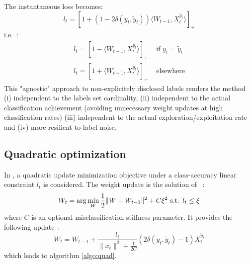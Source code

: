 \documentclass[preprint,12pt,authoryear]{elsarticle}
\begin{document}
The instantaneous loss becomes:
\begin{equation}\label{eq:loss}
l_t = [1 + (1 - 2 \delta(y_t,\tilde{y}_t)) \langle W_{t-1}, X_t^{\tilde{y}_t}\rangle]_+
\end{equation}
i.e.~:
\begin{align}
	l_t = [1 - \langle W_{t-1}, X_t^{\tilde{y}_t}\rangle]_+ &\text{ if }y_t=\tilde{y}_t\label{eq:loss-A}\\
	l_t = [1 + \langle W_{t-1}, X_t^{\tilde{y}_t}\rangle]_+ &\text{ elsewhere} \label{eq:loss-B}
\end{align}
This "agnostic" approach to non-explicitely disclosed labels %
renders the method (i) independent to the labels set cardinality, (ii) independent to the actual classification achievement (avoiding unnecessary weight updates at high classification rates) (iii) independent to the actual exploration/exploitation rate and (iv) more resilient to label noise. 

\subsection{Quadratic optimization}
 
In \cite{crammer2006online}, a quadratic update minimization objective under a class-accuracy linear constraint $ l_t $ is considered.  
The weight update is the solution of ~:
$$W_{t} = \arg \min_W \frac{1}{2} \| W - W_{t-1}\|^2 + C \xi^2 \hbox{ s.t. } l_t \leq \xi$$
where $C$ is an optional misclassification stiffness parameter. It provides the following update~:
$$W_{t} =  W_{t-1} + \frac{l_t}{\|x_t\|^2 + \frac{1}{2C}} (2\delta(y_t,\tilde{y}_t) - 1) X_t^{\tilde{y}_t}$$
which leads to algorithm \ref{algo:quad}.
\end{document}
